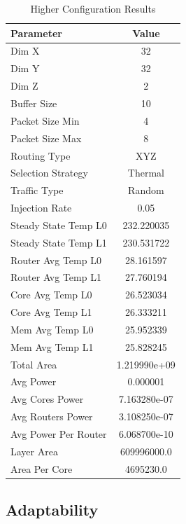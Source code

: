 \documentclass[conference]{IEEEtran}
\begin{document}
\begin{table}[h!]
	\centering
	\begin{tabular}{|l|c|}
		\hline
		\textbf{Parameter} & \textbf{Value} \\ \hline
		Dim X & 32 \\ \hline
		Dim Y & 32 \\ \hline
		Dim Z & 2 \\ \hline
		Buffer Size & 10 \\ \hline
		Packet Size Min & 4 \\ \hline
		Packet Size Max & 8 \\ \hline
		Routing Type & XYZ \\ \hline
		Selection Strategy & Thermal \\ \hline
		Traffic Type & Random \\ \hline
		Injection Rate & 0.05 \\ \hline
		Steady State Temp L0 & 232.220035 \\ \hline
		Steady State Temp L1 & 230.531722 \\ \hline
		Router Avg Temp L0 & 28.161597 \\ \hline
		Router Avg Temp L1 & 27.760194 \\ \hline
		Core Avg Temp L0 & 26.523034 \\ \hline
		Core Avg Temp L1 & 26.333211 \\ \hline
		Mem Avg Temp L0 & 25.952339 \\ \hline
		Mem Avg Temp L1 & 25.828245 \\ \hline
		Total Area & 1.219990e+09 \\ \hline
		Avg Power & 0.000001 \\ \hline
		Avg Cores Power & 7.163280e-07 \\ \hline
		Avg Routers Power & 3.108250e-07 \\ \hline
		Avg Power Per Router & 6.068700e-10 \\ \hline
		Layer Area & 609996000.0 \\ \hline
		Area Per Core & 4695230.0 \\ \hline
	\end{tabular}
	\caption{Higher Configuration Results}
	\label{tab:higher_config_results}
\end{table} 

\subsection{Adaptability}
	
\end{document}
